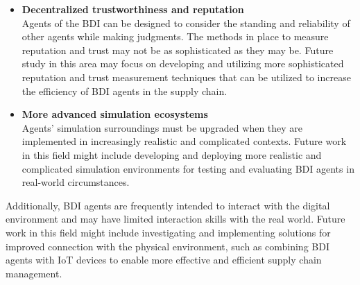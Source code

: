 \begin{itemize}
    \vspace{.5cm}
    
    \item \textbf{Decentralized trustworthiness and reputation} \\ 
    Agents of the \ac{BDI} can be designed to consider the standing and reliability of other agents while making judgments. The methods in place to measure reputation and trust may not be as sophisticated as they may be. Future study in this area may focus on developing and utilizing more sophisticated reputation and trust measurement techniques that can be utilized to increase the efficiency of \ac{BDI} agents in the supply chain.
    
    \vspace{.5cm}
    
    \item \textbf{More advanced simulation ecosystems} \\ 
    Agents' simulation surroundings must be upgraded when they are implemented in increasingly realistic and complicated contexts. Future work in this field might include developing and deploying more realistic and complicated simulation environments for testing and evaluating \ac{BDI} agents in real-world circumstances.

    \vspace{.5cm}
\end{itemize}
Additionally, \ac{BDI} agents are frequently intended to interact with the digital environment and may have limited interaction skills with the real world. Future work in this field might include investigating and implementing solutions for improved connection with the physical environment, such as combining \ac{BDI} agents with IoT devices to enable more effective and efficient supply chain management.